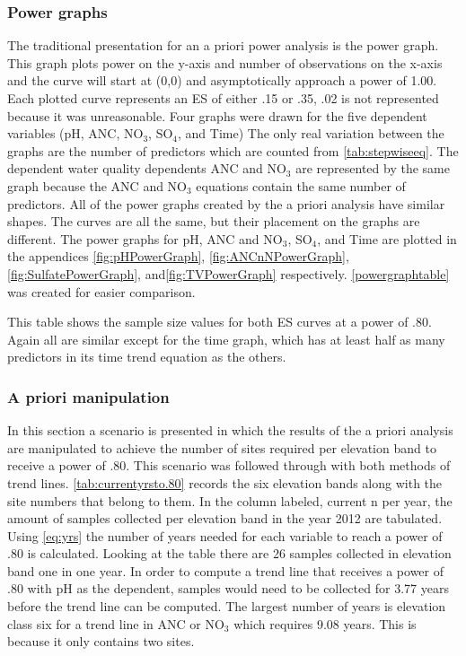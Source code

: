 \subsubsection{Power graphs}
The traditional presentation for an a priori power analysis is the power graph.
This graph plots power on the y-axis and number of observations on the x-axis and the curve will start at (0,0) and asymptotically approach a power of 1.00.
Each plotted curve represents an ES of either .15 or .35, .02 is not represented because it was unreasonable.
Four graphs were drawn for the five dependent variables (pH, ANC, NO$_3$, SO$_4$, and Time)
The only real variation between the graphs are the number of predictors which are counted from \autoref{tab:stepwiseeq}.
The dependent water quality dependents ANC and NO$_3$ are represented by the same graph because the ANC and NO$_3$ equations contain the same number of predictors.
All of the power graphs created by the a priori analysis have similar shapes.
The curves are all the same, but their placement on the graphs are different.
The power graphs for pH, ANC and NO$_3$, SO$_4$, and Time are plotted in the appendices \autoref{fig:pHPowerGraph}, \autoref{fig:ANCnNPowerGraph}, \autoref{fig:SulfatePowerGraph}, and\autoref{fig:TVPowerGraph} respectively.
\autoref{powergraphtable} was created for easier comparison.

This table shows the sample size values for both ES curves at a power of .80.
Again all are similar except for the time graph, which has at least half as many predictors in its time trend equation as the others.

\subsubsection{A priori manipulation}
In this section a scenario is presented in which the results of the a priori analysis are manipulated to achieve the number of sites required per elevation band to receive a power of .80.
This scenario was followed through with both methods of trend lines.
\autoref{tab:currentyrsto.80} records the six elevation bands along with the site numbers that belong to them. 
 In the column labeled, current n per year, the amount of samples collected per elevation band in the year 2012 are tabulated.  
 Using \autoref{eq:yrs} the number of years needed for each variable to reach a power of .80 is calculated.
Looking at the table there are 26  samples collected in elevation band one in one year.  
In order to compute a trend line that receives a power of .80 with pH as the dependent,  samples would need to be collected for 3.77 years before the trend line can be computed.   
The largest number of years is elevation class six for a trend line in ANC or NO$_3$ which requires 9.08 years. 
This is because it only contains two sites.

